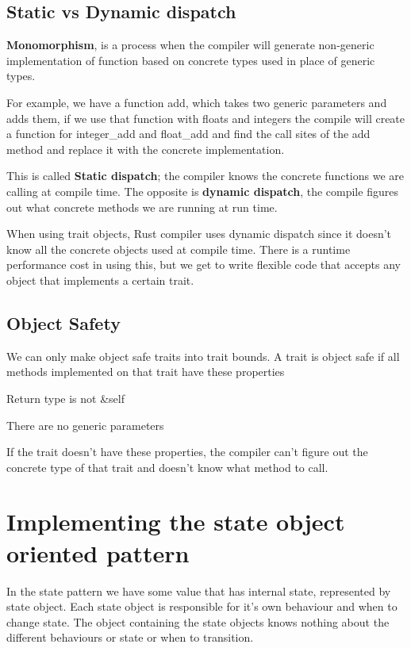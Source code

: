 \subsection{Static vs Dynamic dispatch}
\begin{definition}
    \textbf{Monomorphism}, is a process when the compiler will generate non-generic implementation of function based on concrete types used in place of generic types.
    
    For example, we have a function add, which takes two generic parameters and adds them, if we use that function with floats and integers the compile will create a function for integer\_add and float\_add and find the call sites of the add method and replace it with the concrete implementation.
    
    This is called \textbf{Static dispatch}; the compiler knows the concrete functions we are calling at compile time. The opposite is \textbf{dynamic dispatch}, the compile figures out what concrete methods we are running at run time. 
\end{definition}

When using trait objects, Rust compiler uses dynamic dispatch since it doesn't know all the concrete objects used at compile time. There is a runtime performance cost in using this, but we get to write flexible code that accepts any object that implements a certain trait.


\subsection{Object Safety}

We can only make object safe traits into trait bounds. A trait is object safe if all methods implemented on that trait have these properties\begin{definition}
    \item Return type is not \&self
    \item There are no generic parameters
\end{definition}

If the trait doesn't have these properties, the compiler can't figure out the concrete type of that trait and doesn't know what method to call.


\section{Implementing the state object oriented pattern}

In the state pattern we have some value that has internal state, represented by state object. Each state object is responsible for it's own behaviour and when to change state. The object containing the state objects knows nothing about the different behaviours or state or when to transition.

